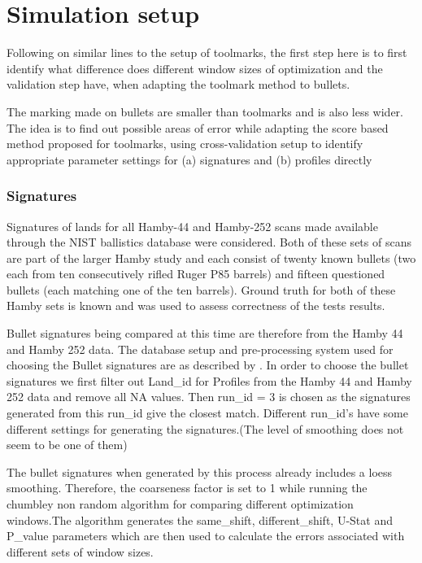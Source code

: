 \documentclass[12pt]{article}
\begin{document}
\section{Simulation setup}\label{simulation-setup}

Following on similar lines to the setup of toolmarks, the first step
here is to first identify what difference does different window sizes of
optimization and the validation step have, when adapting the toolmark
method to bullets.

The marking made on bullets are smaller than toolmarks and is also less
wider. The idea is to find out possible areas of error while adapting
the score based method proposed for toolmarks, using cross-validation
setup to identify appropriate parameter settings for (a) signatures and
(b) profiles directly

\subsubsection{Signatures}\label{signatures}

Signatures of lands for all Hamby-44 and Hamby-252 scans made available
through the NIST ballistics database \citep{nist} were considered. Both
of these sets of scans are part of the larger Hamby study \citep{hamby}
and each consist of twenty known bullets (two each from ten
consecutively rifled Ruger P85 barrels) and fifteen questioned bullets
(each matching one of the ten barrels). Ground truth for both of these
Hamby sets is known and was used to assess correctness of the tests
results.

Bullet signatures being compared at this time are therefore from the
Hamby 44 and Hamby 252 data. The database setup and pre-processing
system used for choosing the Bullet signatures are as described by
\citet{aoas}. In order to choose the bullet signatures we first filter
out Land\_id for Profiles from the Hamby 44 and Hamby 252 data and
remove all NA values. Then run\_id = 3 is chosen as the signatures
generated from this run\_id give the closest match. Different run\_id's
have some different settings for generating the signatures.(The level of
smoothing does not seem to be one of them)

The bullet signatures when generated by this process already includes a
loess smoothing. Therefore, the coarseness factor is set to 1 while
running the chumbley non random algorithm for comparing different
optimization windows.The algorithm generates the same\_shift,
different\_shift, U-Stat and P\_value parameters which are then used to
calculate the errors associated with different sets of window sizes.
\end{document}
